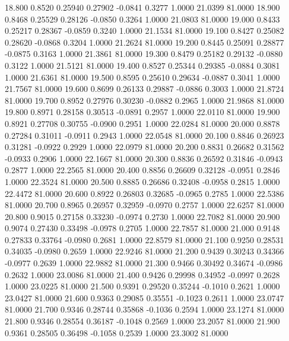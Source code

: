   18.800   0.8520   0.25940   0.27902  -0.0841   0.3277   1.0000  21.0399  81.0000
  18.900   0.8468   0.25529   0.28126  -0.0850   0.3264   1.0000  21.0803  81.0000
  19.000   0.8433   0.25217   0.28367  -0.0859   0.3240   1.0000  21.1534  81.0000
  19.100   0.8427   0.25082   0.28620  -0.0868   0.3204   1.0000  21.2624  81.0000
  19.200   0.8445   0.25091   0.28877  -0.0875   0.3163   1.0000  21.3861  81.0000
  19.300   0.8479   0.25182   0.29132  -0.0880   0.3122   1.0000  21.5121  81.0000
  19.400   0.8527   0.25344   0.29385  -0.0884   0.3081   1.0000  21.6361  81.0000
  19.500   0.8595   0.25610   0.29634  -0.0887   0.3041   1.0000  21.7567  81.0000
  19.600   0.8699   0.26133   0.29887  -0.0886   0.3003   1.0000  21.8724  81.0000
  19.700   0.8952   0.27976   0.30230  -0.0882   0.2965   1.0000  21.9868  81.0000
  19.800   0.8971   0.28158   0.30513  -0.0891   0.2957   1.0000  22.0110  81.0000
  19.900   0.8921   0.27708   0.30755  -0.0900   0.2951   1.0000  22.0284  81.0000
  20.000   0.8878   0.27284   0.31011  -0.0911   0.2943   1.0000  22.0548  81.0000
  20.100   0.8846   0.26923   0.31281  -0.0922   0.2929   1.0000  22.0979  81.0000
  20.200   0.8831   0.26682   0.31562  -0.0933   0.2906   1.0000  22.1667  81.0000
  20.300   0.8836   0.26592   0.31846  -0.0943   0.2877   1.0000  22.2565  81.0000
  20.400   0.8856   0.26609   0.32128  -0.0951   0.2846   1.0000  22.3524  81.0000
  20.500   0.8885   0.26686   0.32408  -0.0958   0.2815   1.0000  22.4472  81.0000
  20.600   0.8922   0.26803   0.32685  -0.0965   0.2785   1.0000  22.5386  81.0000
  20.700   0.8965   0.26957   0.32959  -0.0970   0.2757   1.0000  22.6257  81.0000
  20.800   0.9015   0.27158   0.33230  -0.0974   0.2730   1.0000  22.7082  81.0000
  20.900   0.9074   0.27430   0.33498  -0.0978   0.2705   1.0000  22.7857  81.0000
  21.000   0.9148   0.27833   0.33764  -0.0980   0.2681   1.0000  22.8579  81.0000
  21.100   0.9250   0.28531   0.34035  -0.0980   0.2659   1.0000  22.9246  81.0000
  21.200   0.9439   0.30243   0.34366  -0.0977   0.2639   1.0000  22.9882  81.0000
  21.300   0.9466   0.30492   0.34674  -0.0986   0.2632   1.0000  23.0086  81.0000
  21.400   0.9426   0.29998   0.34952  -0.0997   0.2628   1.0000  23.0225  81.0000
  21.500   0.9391   0.29520   0.35244  -0.1010   0.2621   1.0000  23.0427  81.0000
  21.600   0.9363   0.29085   0.35551  -0.1023   0.2611   1.0000  23.0747  81.0000
  21.700   0.9346   0.28744   0.35868  -0.1036   0.2594   1.0000  23.1274  81.0000
  21.800   0.9346   0.28554   0.36187  -0.1048   0.2569   1.0000  23.2057  81.0000
  21.900   0.9361   0.28505   0.36498  -0.1058   0.2539   1.0000  23.3002  81.0000
